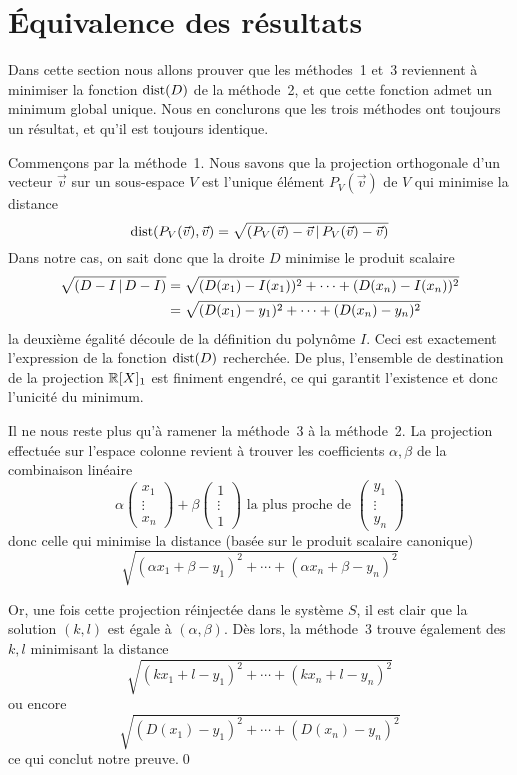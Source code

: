 \section{Équivalence des résultats}

Dans cette section nous allons prouver que les méthodes~1 et~3
reviennent à minimiser la fonction $\mathrm{dist}(D)$ de la méthode~2,
et que cette fonction admet un minimum global unique.
Nous en conclurons que les trois méthodes ont toujours un résultat,
et qu'il est toujours identique.

Commençons par la méthode~1.
Nous savons que la projection orthogonale d'un vecteur $\vec{v}$
sur un sous-espace $V$ est l'unique élément $P_V(\vec{v})$
de $V$ qui minimise la distance
\begin{equation}
    \mathrm{dist}(P_V(\vec{v}),\vec{v}) =
    \sqrt{\left(P_V(\vec{v})-\vec{v}\,\middle|\,P_V(\vec{v})-\vec{v}\right)}
\end{equation}
Dans notre cas, on sait donc que la droite $D$ minimise
le produit scalaire
\begin{equation}
    \begin{aligned}
        \sqrt{\left(D-I\,\middle|\,D-I\right)}
        &= \sqrt{(D(x_1)-I(x_1))^2+\cdots+(D(x_n)-I(x_n))^2} \\
        &= \sqrt{(D(x_1)-y_1)^2+\cdots+(D(x_n)-y_n)^2}
    \end{aligned}
\end{equation}
la deuxième égalité découle de la définition du polynôme $I$.
Ceci est exactement l'expression de la fonction $\mathrm{dist}(D)$ recherchée.
De plus, l'ensemble de destination de la projection $\mathbb{R}[X]_1$
est finiment engendré, ce qui garantit l'existence et donc l'unicité
du minimum.

Il ne nous reste plus qu'à ramener la méthode~3 à la méthode~2.
La projection effectuée sur l'espace colonne revient à trouver
les coefficients $\alpha,\beta$ de la combinaison linéaire
\[
    \alpha
    \left(
        \begin{array}{c}
            x_1\\\vdots\\x_n
        \end{array}
    \right)
    +\beta
    \left(
        \begin{array}{c}
            1\\\vdots\\1
        \end{array}
    \right)
    \mbox{ la plus proche de }
    \left(
        \begin{array}{c}
            y_1\\\vdots\\y_n
        \end{array}
    \right)
\]
donc celle qui minimise la distance (basée sur le produit scalaire canonique)
\[
    \sqrt{(\alpha x_1 + \beta - y_1)^2+\cdots+(\alpha x_n + \beta - y_n)^2}
\]

Or, une fois cette projection réinjectée dans le système $S$,
il est clair que la solution $(k,l)$ est égale à $(\alpha,\beta)$.
Dès lors, la méthode~3 trouve également des $k,l$ minimisant
la distance
\[
    \sqrt{(kx_1+l-y_1)^2+\cdots+(kx_n+l-y_n)^2}
\]
ou encore
\[
    \sqrt{(D(x_1)-y_1)^2+\cdots+(D(x_n)-y_n)^2}
\]
ce qui conclut notre preuve.\qed
